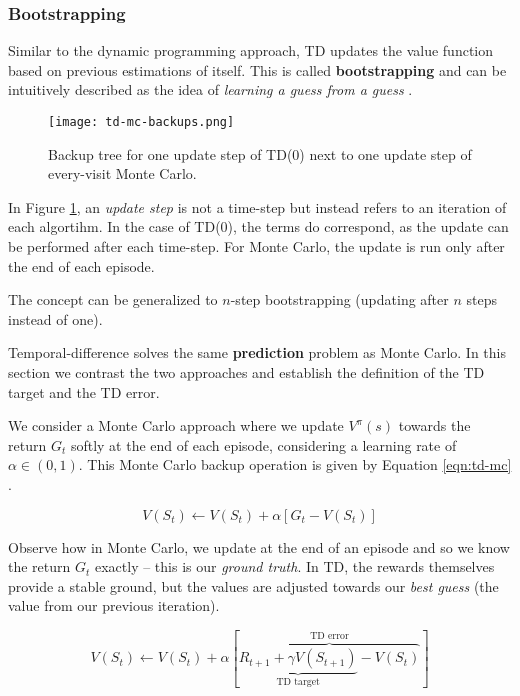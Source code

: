 \subsubsection{Bootstrapping}
Similar to the dynamic programming approach, TD updates the value function based on previous estimations of itself.
This is called \textbf{bootstrapping} and can be intuitively described as the idea of \emph{learning a guess from a guess} \cite{rlai}.

\begin{figure}[h]
    \texttt{[image: td-mc-backups.png]}
    \centering
    \caption[Caption]{Backup tree for one update step of TD(0) next to one update step of every-visit Monte Carlo.} \label{fig:td-mc-update-steps}
\end{figure}

In Figure \ref{fig:td-mc-update-steps}, an \emph{update step} is not a time-step but instead refers to an iteration of each algortihm.
In the case of TD(0), the terms do correspond, as the update can be performed after each time-step.
For Monte Carlo, the update is run only after the end of each episode.

The concept can be generalized to $n$-step bootstrapping (updating after $n$ steps instead of one).

Temporal-difference solves the same \textbf{prediction} problem as Monte Carlo.
In this section we contrast the two approaches and establish the definition of the TD target and the TD error.

We consider a Monte Carlo approach where we update $V^{\pi}(s)$ towards the return $G_t$ softly at the end of each episode, considering a learning rate of $\alpha \in (0, 1)$.
This Monte Carlo backup operation is given by Equation \ref{eqn:td-mc} \cite{rlai}.

\begin{equation} \label{eqn:td-mc}
    V(S_t) \leftarrow  V(S_t) + \alpha[G_t - V(S_t)]
\end{equation}

Observe how in Monte Carlo, we update at the end of an episode and so we know the return $G_t$ exactly -- this is our \emph{ground truth}.
In TD, the rewards themselves provide a stable ground, but the values are adjusted towards our \emph{best guess} (the value from our previous iteration).

\begin{equation} \label{eqn:td-td}
    V(S_t) \leftarrow  V(S_t) + \alpha[
        \overbrace{\underbrace{R_{t+1} + \gamma V(S_{t+1})}_\text{TD target} - V(S_t)}^\text{TD error}
    ]
\end{equation}

